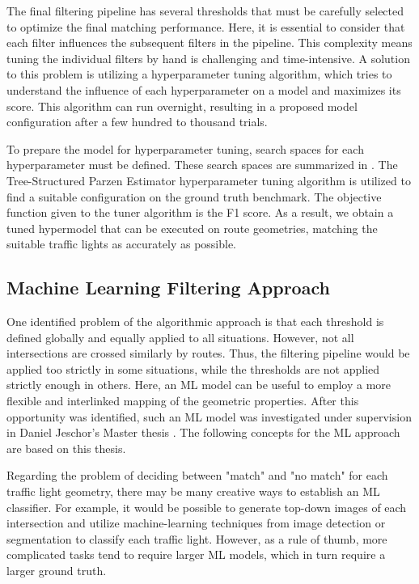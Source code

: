 The final filtering pipeline has several thresholds that must be carefully selected to optimize the final matching performance. Here, it is essential to consider that each filter influences the subsequent filters in the pipeline. This complexity means tuning the individual filters by hand is challenging and time-intensive. A solution to this problem is utilizing a hyperparameter tuning algorithm, which tries to understand the influence of each hyperparameter on a model and maximizes its score. This algorithm can run overnight, resulting in a proposed model configuration after a few hundred to thousand trials. 

To prepare the model for hyperparameter tuning, search spaces for each hyperparameter must be defined. These search spaces are summarized in . The Tree-Structured Parzen Estimator hyperparameter tuning algorithm \cite{ozaki_multiobjective_2020} is utilized to find a suitable configuration on the ground truth benchmark. The objective function given to the tuner algorithm is the F1 score. As a result, we obtain a tuned hypermodel that can be executed on route geometries, matching the suitable traffic lights as accurately as possible.

\subsection{Machine Learning Filtering Approach}\label{sec:jeschor1}

One identified problem of the algorithmic approach is that each threshold is defined globally and equally applied to all situations. However, not all intersections are crossed similarly by routes. Thus, the filtering pipeline would be applied too strictly in some situations, while the thresholds are not applied strictly enough in others. Here, an ML model can be useful to employ a more flexible and interlinked mapping of the geometric properties. After this opportunity was identified, such an ML model was investigated under supervision in Daniel Jeschor's Master thesis \cite{jeschor_2022}. The following concepts for the ML approach are based on this thesis.

Regarding the problem of deciding between "match" and "no match" for each traffic light geometry, there may be many creative ways to establish an ML classifier. For example, it would be possible to generate top-down images of each intersection and utilize machine-learning techniques from image detection or segmentation to classify each traffic light. However, as a rule of thumb, more complicated tasks tend to require larger ML models, which in turn require a larger ground truth. 

